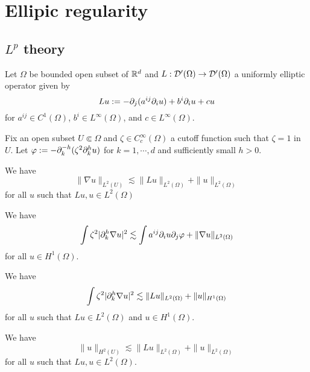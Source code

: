 \documentclass{../../large}
\begin{document}
\chapter{Ellipic regularity}
\section{$L^p$ theory}
\begin{prb}
Let $\Omega$ be bounded open subset of $\mathbb{R}^d$ and $L:\mathcal{D}'(\Omega)\to\mathcal{D}'(\Omega)$ a uniformly elliptic operator given by
\[Lu:=-\pd_j(a^{ij}\pd_iu)+b^i\pd_iu+cu\]
for $a^{ij}\in C^1(\Omega)$, $b^i\in L^\infty(\Omega)$, and $c\in L^\infty(\Omega)$.

Fix an open subset $U\Subset\Omega$ and $\zeta\in C_c^\infty(\Omega)$ a cutoff function such that $\zeta=1$ in $U$.
Let $\f:=-\pd_k^{-h}(\zeta^2\pd_k^hu)$ for $k=1,\cdots,d$ and sufficiently small $h>0$.
\begin{parts}
\item We have
\[\|\nabla u\|_{L^2(U)}\lesssim\|Lu\|_{L^2(\Omega)}+\|u\|_{L^2(\Omega)}\]
for all $u$ such that $Lu,u\in L^2(\Omega)$
\item We have
\[\int\zeta^2|\pd_k^h\nabla u|^2\lesssim\int a^{ij}\pd_iu\pd_j\f+\|\nabla u\|_{L^2(\Omega)}\]
for all $u\in H^1(\Omega)$.
\item We have
\[\int\zeta^2|\pd_k^h\nabla u|^2\lesssim\|Lu\|_{L^2(\Omega)}+\|u\|_{H^1(\Omega)}\]
for all $u$ such that $Lu\in L^2(\Omega)$ and $u\in H^1(\Omega)$.
\item We have
\[\|u\|_{H^2(U)}\lesssim\|Lu\|_{L^2(\Omega)}+\|u\|_{L^2(\Omega)}\]
for all $u$ such that  $Lu,u\in L^2(\Omega)$.
\end{parts}
\end{prb}
\end{document}
